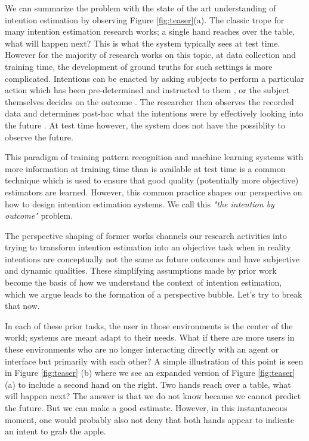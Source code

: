 \documentclass[manuscript,screen,review]{acmart}
\begin{document}
We can summarize the problem with the state of the art understanding of intention estimation by observing Figure \ref{fig:teaser}(a). The classic trope for many intention estimation research works; a single hand reaches over the table, what will happen next? This is what the system typically sees at test time. However for the majority of research works on this topic, at data collection and training time, the development of ground truths for such settings is more complicated. Intentions can be enacted by asking subjects to perform a particular action which has been pre-determined and instructed to them \cite{10.1007/s11263-018-1104-4}, or the subject themselves decides on the outcome \cite{Huang2015}. The researcher then observes the recorded data and determines post-hoc what the intentions were by effectively looking into the future \cite{objectpicking2021,Huang2015}. At test time however, the system does not have the possiblity to observe the future. 

This paradigm of training pattern recognition and machine learning systems with more information at training time than is available at test time is a common technique which is used to ensure that good quality (potentially more objective) estimators are learned. However, this common practice shapes our perspective on how to design intention estimation systems. We call this \emph{"the intention by outcome"} problem.

The perspective shaping of former works channels our research activities into trying to transform intention estimation into an objective task when in reality intentions are conceptually not the same as future outcomes and have subjective and dynamic qualities. These simplifying assumptions made by prior work become the basis of how we understand the context of intention estimation, which we argue leads to the formation of a perspective bubble. Let's try to break that now. 

In each of these prior tasks, the user in those environments is the center of the world; systems are meant adapt to their needs. What if there are more users in these environments who are no longer interacting directly with an agent or interface but primarily with each other? A simple illustration of this point is seen in Figure \ref{fig:teaser} (b) where we see an expanded version of Figure \ref{fig:teaser}(a) to include a second hand on the right. Two hands reach over a table, what will happen next? The answer is that we do not know because we cannot predict the future. But we can make a good estimate. However, in this instantaneous moment, one would probably also not deny that both hands appear to indicate an intent to grab the apple.  
\end{document}
